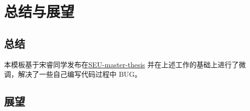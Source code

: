 \chapter{总结与展望}
\label{chp:version_license}

\section{总结}

本模板基于宋睿同学发布在\href{https://github.com/TouchFishPioneer/SEU-master-thesis}{SEU-master-thesis} 并在上述工作的基础上进行了微调，解决了一些自己编写代码过程中 BUG。

\section{展望}
